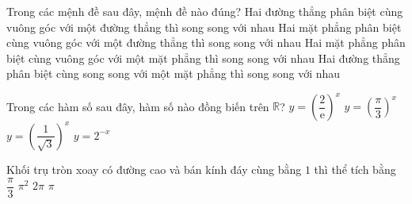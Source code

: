 \begin{ex}%
Trong các mệnh đề sau đây, mệnh đề nào đúng?
	\choice
	{Hai đường thẳng phân biệt cùng vuông góc với một đường thẳng thì song song với nhau}
	{\True Hai mặt phẳng phân biệt cùng vuông góc với một đường thẳng thì song song với nhau}
	{Hai mặt phẳng phân biệt cùng vuông góc với một mặt phẳng thì song song với nhau}
	{Hai đường thẳng phân biệt cùng song song với một mặt phẳng thì song song với nhau}
\end{ex}
\begin{ex}%
Trong các hàm số sau đây, hàm số nào đồng biến trên $ \mathbb R $?
	\choice
	{$ y=\left(\dfrac{2}{\mathrm {e}}\right)^x $}
	{\True $ y=\left(\dfrac{\pi}{3}\right)^x $}
	{$ y=\left(\dfrac{1}{\sqrt 3}\right)^x $}
	{$ y=2^{-x} $}
\end{ex}
\begin{ex}%
Khối trụ tròn xoay có đường cao và bán kính đáy cùng bằng $ 1 $ thì thể tích bằng
	\choice
	{$ \dfrac{\pi}{3} $}
	{$ \pi^2 $}
	{$ 2\pi $}
	{\True $ \pi $}
\end{ex}
